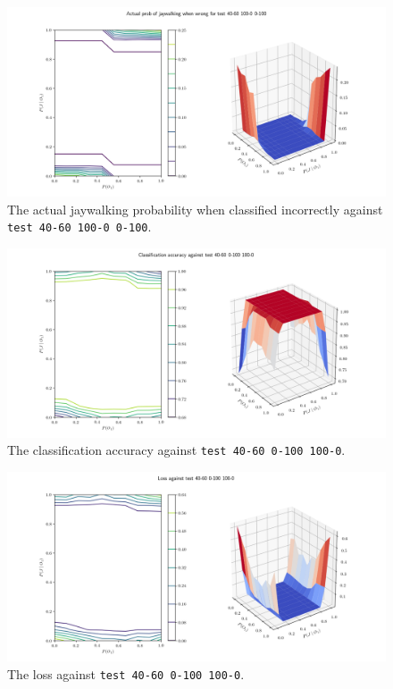 \documentclass[]{report}
\newcommand{\code}{\texttt}
\begin{document}
\begin{figure}[h]
    \centering
    \centerline{\includegraphics[scale=0.55]{test_40-60_100-0_0-100_jay_prob.png}}
    \caption[]{The actual jaywalking probability when classified incorrectly against \code{test 40-60 100-0 0-100}.}
    \label{fig:test_40-60_100-0_0-100_jay_prob_plot}
\end{figure}

% 
% 

\begin{figure}[h]
    \centering
    \centerline{\includegraphics[scale=0.55]{test_40-60_0-100_100-0_accuracy.png}}
    \caption[]{The classification accuracy against \code{test 40-60 0-100 100-0}.}
    \label{fig:test_40-60_0-100_100-0_accuracy_plot}
\end{figure}

\begin{figure}[h]
    \centering
    \centerline{\includegraphics[scale=0.55]{test_40-60_0-100_100-0_loss.png}}
    \caption[]{The loss against \code{test 40-60 0-100 100-0}.}
    \label{fig:test_40-60_0-100_100-0_loss_plot}
\end{figure}
\end{document}
